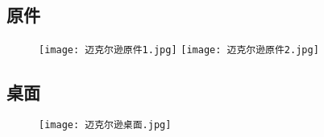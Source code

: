 \documentclass[dvipsnames, svgnames,a4paper,11pt]{article}
\begin{document}
\subsection*{原件}
%
	
	

\begin{figure}[H]
	\centering
	\texttt{[image: 迈克尔逊原件1.jpg]}
	\texttt{[image: 迈克尔逊原件2.jpg]}
\end{figure}
\subsection*{桌面}
\begin{figure}[H]
	\texttt{[image: 迈克尔逊桌面.jpg]}
\end{figure}
\end{document}
